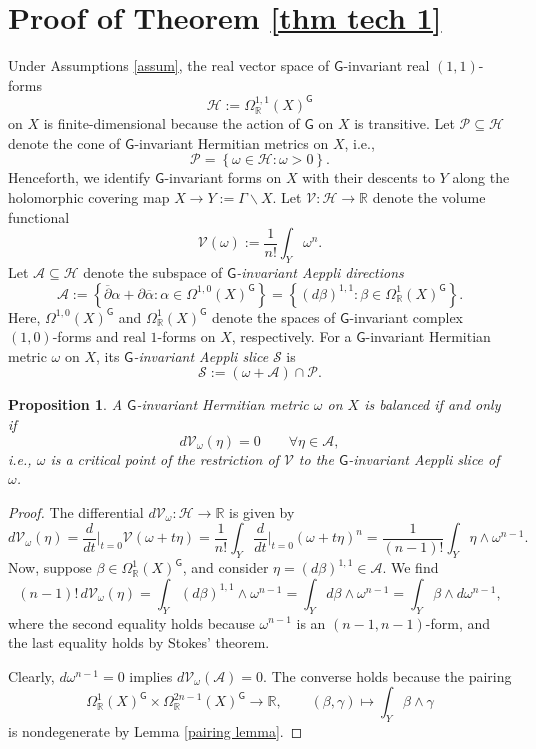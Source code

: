 \documentclass[11pt,reqno]{amsart}
\newcommand{\R}{\mathbb R}
\renewcommand{\P}{\mathcal {P}}
\newcommand{\G}{\mathsf {G}}
\newcommand{\V}{\mathcal {V}}
\newcommand{\A}{\mathcal A}
\renewcommand{\H}{\mathcal H}
\renewcommand{\S}{\mathcal S}
\theoremstyle{plain}
\newtheorem{proposition}[theorem]{Proposition}
\theoremstyle{definition}
\theoremstyle{remark}
\begin{document}
\section{Proof of Theorem \ref{thm tech 1}}
\label{sec 2}
Under Assumptions \ref{assum},  the real vector space of  $\G$-invariant real $(1,1)$-forms $$\H := \Omega_\R^{1,1}(X)^\G$$ on $X$ is finite-dimensional because the action of $\G$ on $X$ is transitive. Let $\P \subseteq \H$ denote the cone of $\G$-invariant Hermitian metrics on $X$, i.e.,
$$\P = \left\{  \omega \in \H : \omega > 0\right\}.$$
Henceforth, we identify $\G$-invariant forms on $X$ with their descents to $Y$ along the holomorphic covering map $X \rightarrow Y := \Gamma \backslash X$.
Let $\V: \H\rightarrow \R$ denote the volume functional
$$\V(\omega) := \frac{1}{n!} \int_Y \omega^n.$$
Let $\A \subseteq \H$ denote the subspace of \textit{$\G$-invariant Aeppli directions}
$$\A := \left\{ \overline \partial \alpha + \partial \overline \alpha: \alpha \in \Omega^{1,0}(X)^\G\right\} = \left\{(d \beta)^{1,1} : \beta \in \Omega^1_\R(X)^\G \right\}.$$
Here, $\Omega^{1,0}(X)^\G$ and $\Omega^1_\R(X)^\G$ denote the spaces of $\G$-invariant complex $(1,0)$-forms and real  $1$-forms on $X$, respectively.  For a $\G$-invariant Hermitian metric $\omega$ on $X$, its \textit{$\G$-invariant Aeppli slice} $\S$ is 
$$\S := (\omega + \A) \cap \P.$$

\begin{proposition}
    \label{prop_balanced_characterisation}
    A $\G$-invariant Hermitian metric $\omega$ on $X$ is balanced if and only if 
    $$d \V_\omega(\eta) = 0 \qquad \forall \eta \in \A,$$
    i.e., $\omega$ is a critical point of the restriction of $\V$ to the $\G$-invariant Aeppli slice of $\omega$.
\end{proposition}
\begin{proof}
    The differential  $d \V_\omega:  \H \rightarrow \R$ is given by
    $$d \V_\omega(\eta) = \frac{d}{dt}\bigg|_{t = 0} \V(\omega + t \eta)= \frac{1}{n!}\int_Y\frac{d}{dt}\bigg|_{t = 0} (\omega + t \eta)^n  = \frac{1}{(n-1)!} \int_Y \eta \wedge \omega^{n-1}.$$
    Now, suppose $\beta \in \Omega^1_\R(X)^\G$, and consider $\eta = (d \beta)^{1,1} \in \A$. We find 
    $$(n-1)! \,d \V_\omega(\eta) = \int_Y (d\beta)^{1,1} \wedge \omega^{n-1} = \int_Y d \beta \wedge \omega^{n-1} =  \int_Y  \beta \wedge d\omega^{n-1},$$
    where  the second equality holds because $\omega^{n-1}$ is an $(n-1,n-1)$-form, and the last equality holds by Stokes' theorem. 

    Clearly, $d \omega^{n-1} = 0$ implies $d \V_\omega(\A) = 0$. The converse holds because the pairing $$\Omega^1_\R(X)^\G \times \Omega^{2n-1}_\R(X)^\G \rightarrow \R, \qquad (\beta, \gamma) \mapsto \int_Y \beta \wedge \gamma$$
    is nondegenerate by Lemma \ref{pairing lemma}.
\end{proof}
\end{document}

